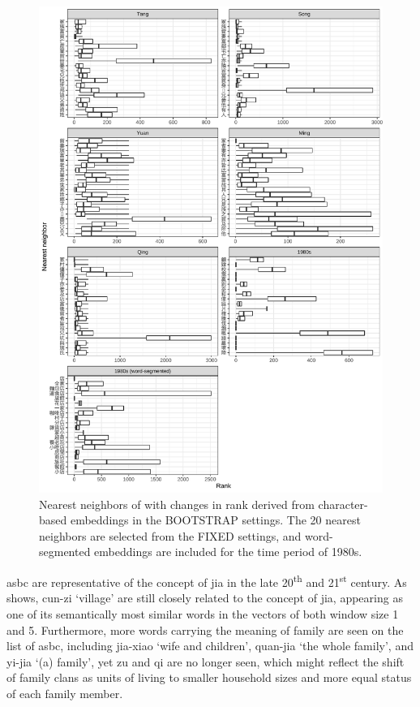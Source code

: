 \newpage
\begin{figure}[H]
  \centering
  \includegraphics[height=0.85\textheight,keepaspectratio]{figures_new/bootstrap_for_stability/neighbor_rank_change.pdf}
  \caption{Nearest neighbors of \jia with changes in rank derived from character-based embeddings in the BOOTSTRAP settings. The 20 nearest neighbors are selected from the FIXED settings, and word-segmented embeddings are included for the time period of 1980s.}
\end{figure}

\gls{asbc} are representative of the concept of jia in the late 20\textsuperscript{th} and 21\textsuperscript{st} century. As  shows, cun-zi `village' are still closely related to the concept of jia, appearing as one of its semantically most similar words in the vectors of both window size 1 and 5. Furthermore, more words carrying the meaning of family are seen on the list of \gls{asbc}, including jia-xiao `wife and children', quan-jia `the whole family', and yi-jia `(a) family', yet zu and qi are no longer seen, which might reflect the shift of family clans as units of living to smaller household sizes and more equal status of each family member.

